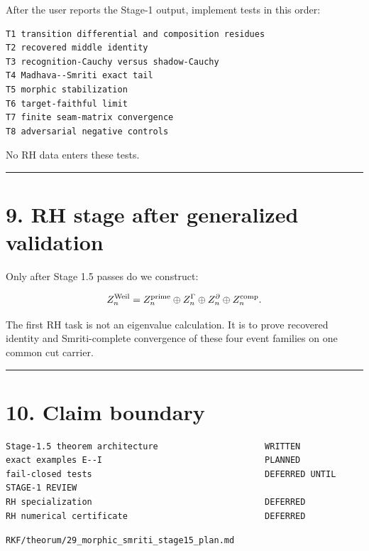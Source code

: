 After the user reports the Stage-1 output, implement tests in this order:

\begin{verbatim}
T1 transition differential and composition residues
T2 recovered middle identity
T3 recognition-Cauchy versus shadow-Cauchy
T4 Madhava--Smriti exact tail
T5 morphic stabilization
T6 target-faithful limit
T7 finite seam-matrix convergence
T8 adversarial negative controls
\end{verbatim}

No RH data enters these tests.

\begin{center}\rule{0.5\linewidth}{0.5pt}\end{center}

\hypertarget{rh-stage-after-generalized-validation}{%
\section{9. RH stage after generalized validation}\label{rh-stage-after-generalized-validation}}

Only after Stage 1.5 passes do we construct:

\[
Z_n^{\rm Weil}
=Z_n^{\rm prime}
\oplus Z_n^{\Gamma}
\oplus Z_n^{\partial}
\oplus Z_n^{\rm comp}.
\]

The first RH task is not an eigenvalue calculation. It is to prove recovered
identity and Smriti-complete convergence of these four event families on one
common cut carrier.

\begin{center}\rule{0.5\linewidth}{0.5pt}\end{center}

\hypertarget{claim-boundary}{%
\section{10. Claim boundary}\label{claim-boundary}}

\begin{verbatim}
Stage-1.5 theorem architecture                     WRITTEN
exact examples E--I                                PLANNED
fail-closed tests                                  DEFERRED UNTIL STAGE-1 REVIEW
RH specialization                                  DEFERRED
RH numerical certificate                           DEFERRED
\end{verbatim}

\begin{flushright}\small\texttt{RKF/theorum/29\_morphic\_smriti\_stage15\_plan.md}\end{flushright}
